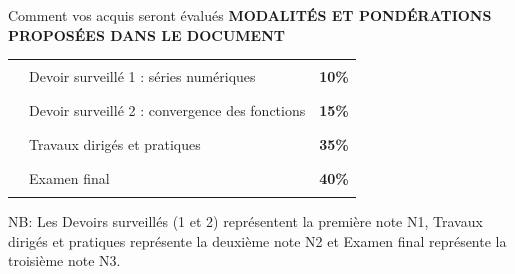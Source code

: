\documentclass[aspectratio=169,10pt]{beamer}
\newcommand{\meta}[1]{{\small\bfseries\color{turquoise} #1}\par\vspace{0.07cm}}
\begin{document}
\begin{frame}{Comment vos acquis seront évalués}
\meta{MODALITÉS ET PONDÉRATIONS PROPOSÉES DANS LE DOCUMENT}
\begin{center}
\end{center}
\vspace{0.12cm}
\begin{tcolorbox}[colback=pale,colframe=pale]
\small\renewcommand{\arraystretch}{1.24}
\begin{tabular}{@{}p{.65cm}p{9.2cm}r@{}}
\textcolor{bleu}{\rule{.35cm}{.22cm}} & Devoir surveillé 1 : séries numériques & \textbf{10\%}\\
\textcolor{turquoise}{\rule{.35cm}{.22cm}} & Devoir surveillé 2 : convergence des fonctions & \textbf{15\%}\\
\textcolor{soleil}{\rule{.35cm}{.22cm}} & Travaux dirigés et pratiques & \textbf{35\%}\\
\textcolor{nuit}{\rule{.35cm}{.22cm}} & Examen final & \textbf{40\%}\\
\end{tabular}
\end{tcolorbox}
\vspace{0.08cm}
{\small\color{gris} NB: Les Devoirs surveillés (1 et 2) représentent la première note N1, Travaux dirigés et pratiques représente la deuxième note N2 et Examen final représente la troisième note N3.}
\end{frame}
\end{document}
